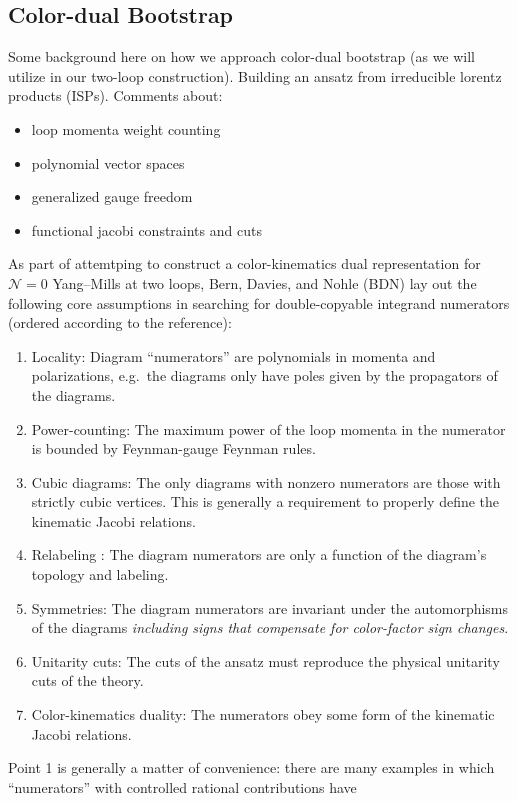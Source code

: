 \documentclass[11pt,letter]{article}
\newcommand{\eg}{e.g.~}
\begin{document}
\subsection{Color-dual Bootstrap}
\label{sec:bootstrap}
Some background here on how we approach color-dual bootstrap (as we will utilize in our two-loop construction). Building an ansatz from irreducible lorentz products (ISPs). Comments about:
\begin{itemize}
\item loop momenta weight counting 
\item polynomial vector spaces 
\item generalized gauge freedom
\item functional jacobi constraints and cuts
\end{itemize}


As part of attemtping to construct a color-kinematics dual
representation for $\mathcal{N}=0$ Yang--Mills at two loops, Bern,
Davies, and Nohle (BDN) \cite{Bern:2015ooa} lay out the following core
assumptions in searching for double-copyable integrand numerators (ordered according to the
reference):
\begin{enumerate}
\item Locality: Diagram ``numerators'' are polynomials in momenta and
  polarizations, \eg the diagrams only have poles given by the
  propagators of the diagrams.
\item Power-counting: The maximum power of the loop momenta in the
  numerator is bounded by Feynman-gauge Feynman rules.
\item Cubic diagrams: The only diagrams with nonzero numerators are
  those with strictly cubic vertices.  This is generally a requirement
  to properly define the kinematic Jacobi relations.
\item Relabeling : The diagram numerators are only a function of the
  diagram's topology and labeling.
\item Symmetries: The diagram numerators are invariant under the
  automorphisms of the diagrams \emph{including signs that compensate
    for color-factor sign changes}.
\item Unitarity cuts: The cuts of the ansatz must reproduce the
  physical unitarity cuts of the theory.
\item Color-kinematics duality: The numerators obey some form of the
  kinematic Jacobi relations.
\end{enumerate}
Point 1 is generally a matter of convenience: there are many examples
in which ``numerators'' with controlled rational contributions have
\end{document}
